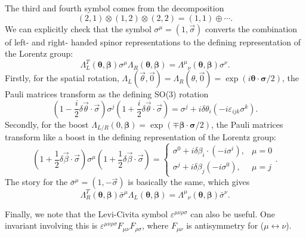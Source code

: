 The third and fourth symbol comes from the decomposition
\begin{equation}
	\left(2, 1\right) \otimes \left(1,2\right) \otimes \left(2, 2\right)
	= \left(1, 1\right) \oplus \cdots.
\end{equation}
We can explicitly check that the symbol $\sigma^\mu = (1, \vec \sigma)$ converts the combination of left- and right- handed spinor representations to the defining representation of the Lorentz group:
\begin{equation}
	\Lambda_L^T(\bm \theta, \bm \beta) \sigma^\mu \Lambda_R(\bm \theta, \bm \beta)
	= {\Lambda^\mu}_\nu(\bm \theta,\bm \beta) \sigma^\nu.
\end{equation}
Firstly, for the spatial rotation, $\Lambda_L(\vec\theta,\vec 0) = \Lambda_R(\theta,\vec 0) = \exp(i\bm\theta\cdot \bm\sigma/2)$, the Pauli matrices transform as the defining SO(3) rotation
\begin{equation}
	\left(1-\frac{i}{2}\delta\vec\theta\cdot \vec\sigma \right)\sigma^j\left(1+\frac{i}{2}\delta\vec\theta\cdot \vec\sigma\right)
	= \sigma^j + i\delta\theta_i \left(-i \varepsilon_{ijk}\sigma^k \right).
\end{equation}
Secondly, for the boost $\Lambda_{L/R}(0, \bm\beta) = \exp\left(\mp \bm\beta\cdot \bm\sigma /2 \right)$, the Pauli matrices transform like a boost in the defining representation of the Lorentz group:
\begin{equation}
	\left(1+\frac{1}{2}\delta\vec\beta\cdot \vec\sigma\right) \sigma^\mu 
	\left(1+\frac{1}{2}\delta\vec\beta\cdot \vec\sigma\right) = \begin{cases}
		 \sigma^0 + i\delta\beta_i \cdot (-i\sigma^i), & \mu = 0 \\
		 \sigma^j + i\delta\beta_j (-i\sigma^0), & \mu = j
	\end{cases}.
\end{equation}
The story for the $\bar\sigma^\mu=(1,-\vec\sigma)$ is basically the same, which gives
\begin{equation}
	\Lambda_R^T(\bm \theta, \bm \beta) \bar\sigma^\mu \Lambda_L(\bm \theta, \bm \beta)
	= {\Lambda^\mu}_\nu(\bm \theta,\bm \beta) \bar\sigma^\nu.
\end{equation}

Finally, we note that the Levi-Civita symbol $\varepsilon^{\mu\nu\rho\sigma}$ can also be useful.
One invariant involving this is $\varepsilon^{\mu\nu\rho\sigma} F_{\mu\nu} F_{\rho\sigma}$, where $F_{\mu\nu}$ is antisymmetry for ($\mu \leftrightarrow \nu$).






